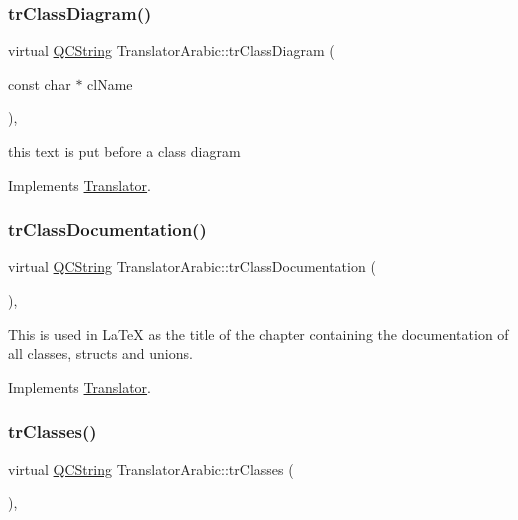 \subsubsection{\texorpdfstring{trClassDiagram()}{trClassDiagram()}}
{\footnotesize\ttfamily virtual \mbox{\hyperlink{class_q_c_string}{Q\+C\+String}} Translator\+Arabic\+::tr\+Class\+Diagram (\begin{DoxyParamCaption}\item[{const char $\ast$}]{cl\+Name }\end{DoxyParamCaption})\hspace{0.3cm}{\ttfamily [inline]}, {\ttfamily [virtual]}}

this text is put before a class diagram 

Implements \mbox{\hyperlink{class_translator}{Translator}}.

\mbox{\label{class_translator_arabic_a169f9b2baaf46468d775d1934f4a8043}} 
\subsubsection{\texorpdfstring{trClassDocumentation()}{trClassDocumentation()}}
{\footnotesize\ttfamily virtual \mbox{\hyperlink{class_q_c_string}{Q\+C\+String}} Translator\+Arabic\+::tr\+Class\+Documentation (\begin{DoxyParamCaption}{ }\end{DoxyParamCaption})\hspace{0.3cm}{\ttfamily [inline]}, {\ttfamily [virtual]}}

This is used in La\+TeX as the title of the chapter containing the documentation of all classes, structs and unions. 

Implements \mbox{\hyperlink{class_translator}{Translator}}.

\mbox{\label{class_translator_arabic_afb6f5a575aa2fa43e443a44a1c63f01d}} 
\subsubsection{\texorpdfstring{trClasses()}{trClasses()}}
{\footnotesize\ttfamily virtual \mbox{\hyperlink{class_q_c_string}{Q\+C\+String}} Translator\+Arabic\+::tr\+Classes (\begin{DoxyParamCaption}{ }\end{DoxyParamCaption})\hspace{0.3cm}{\ttfamily [inline]}, {\ttfamily [virtual]}}

